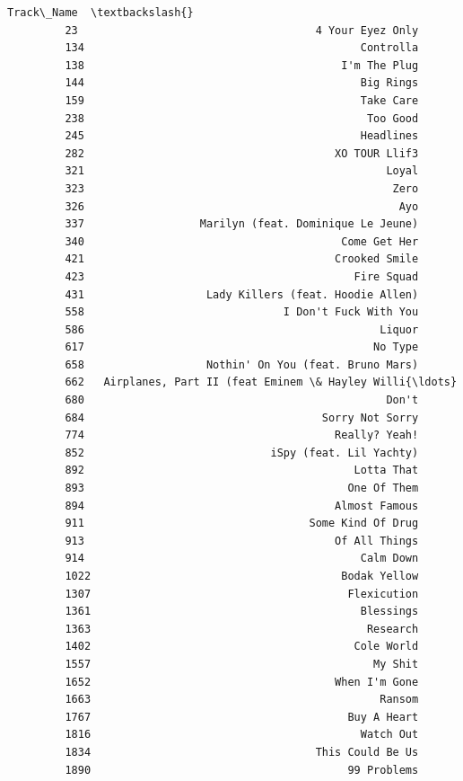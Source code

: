 \documentclass[11pt]{article}
\begin{document}
\begin{Verbatim}[commandchars=\\\{\}]
                                                      Track\_Name  \textbackslash{}
         23                                     4 Your Eyez Only   
         134                                           Controlla   
         138                                        I'm The Plug   
         144                                           Big Rings   
         159                                           Take Care   
         238                                            Too Good   
         245                                           Headlines   
         282                                       XO TOUR Llif3   
         321                                               Loyal   
         323                                                Zero   
         326                                                 Ayo   
         337                  Marilyn (feat. Dominique Le Jeune)   
         340                                        Come Get Her   
         421                                       Crooked Smile   
         423                                          Fire Squad   
         431                   Lady Killers (feat. Hoodie Allen)   
         558                               I Don't Fuck With You   
         586                                              Liquor   
         617                                             No Type   
         658                   Nothin' On You (feat. Bruno Mars)   
         662   Airplanes, Part II (feat Eminem \& Hayley Willi{\ldots}   
         680                                               Don't   
         684                                     Sorry Not Sorry   
         774                                       Really? Yeah!   
         852                             iSpy (feat. Lil Yachty)   
         892                                          Lotta That   
         893                                         One Of Them   
         894                                       Almost Famous   
         911                                   Some Kind Of Drug   
         913                                       Of All Things   
         914                                           Calm Down   
         1022                                       Bodak Yellow   
         1307                                        Flexicution   
         1361                                          Blessings   
         1363                                           Research   
         1402                                         Cole World   
         1557                                            My Shit   
         1652                                      When I'm Gone   
         1663                                             Ransom   
         1767                                        Buy A Heart   
         1816                                          Watch Out   
         1834                                   This Could Be Us   
         1890                                        99 Problems   
         

\end{Verbatim}
\end{document}
